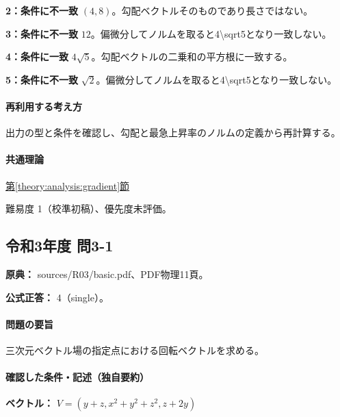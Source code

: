 \noindent\textbf{2：条件に不一致} \((4,8)\)。勾配ベクトルそのものであり長さではない。\par

\noindent\textbf{3：条件に不一致} \(12\)。偏微分してノルムを取ると4\textbackslash{}sqrt5となり一致しない。\par

\noindent\textbf{4：条件に一致} \(4\sqrt5\)。勾配ベクトルの二乗和の平方根に一致する。\par

\noindent\textbf{5：条件に不一致} \(\sqrt2\)。偏微分してノルムを取ると4\textbackslash{}sqrt5となり一致しない。\par

\paragraph{再利用する考え方} 出力の型と条件を確認し、勾配と最急上昇率のノルムの定義から再計算する。

\paragraph{共通理論} \hyperref[theory:analysis:gradient]{第\ref*{theory:analysis:gradient}節}

\par 難易度 1（校準初稿）、優先度未評価。

\subsection{令和3年度 問3-1}
\label{q:r03-reg-basic-3-1}

\noindent\textbf{原典：} sources/R03/basic.pdf、PDF物理11頁。

\textbf{公式正答：} 4（single）。

\paragraph{問題の要旨} 三次元ベクトル場の指定点における回転ベクトルを求める。

\paragraph{確認した条件・記述（独自要約）}\mbox{}\par

\noindent\textbf{ベクトル：} \(V=(y+z,x^2+y^2+z^2,z+2y)\)\par

